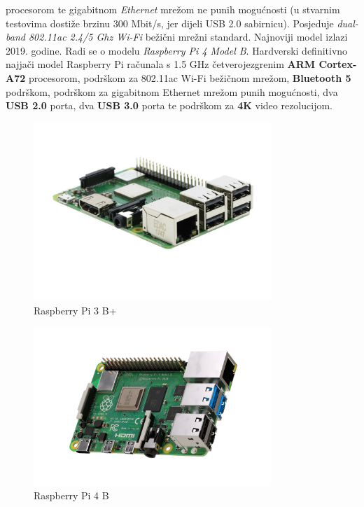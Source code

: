 \documentclass[11pt]{article}
\begin{document}
 procesorom te gigabitnom \textit{Ethernet} mrežom ne punih mogućnosti (u
 stvarnim testovima dostiže brzinu 300 Mbit/s, jer dijeli USB 2.0 sabirnicu).
 Posjeduje \textit{dual-band 802.11ac 2.4/5 Ghz Wi-Fi} bežični mrežni standard.
\newline
\newline
 Najnoviji model izlazi 2019. godine. Radi se o modelu \textit{Raspberry Pi
 4 Model B}. Hardverski definitivno najjači model Raspberry Pi računala s
 1.5 GHz četverojezgrenim \textbf{ARM Cortex-A72} procesorom, podrškom za
 802.11ac Wi-Fi bežičnom mrežom, \textbf{Bluetooth 5} podrškom,
 podrškom za gigabitnom Ethernet mrežom punih mogućnosti, dva \textbf{USB 2.0}
 porta, dva \textbf{USB 3.0} porta te podrškom za \textbf{4K} video rezolucijom.
\begin{figure}[h!]
\centering
\includegraphics[width=0.8\textwidth]{rpi-3-b-plus.jpg}
\captionsetup{justification=centering}
\caption{Raspberry Pi 3 B+}
\end{figure}
\begin{figure}[h!]
\centering
\includegraphics[width=0.8\textwidth]{rpi-4.png}
\captionsetup{justification=centering}
\caption{Raspberry Pi 4 B}
\end{figure}
\end{document}
